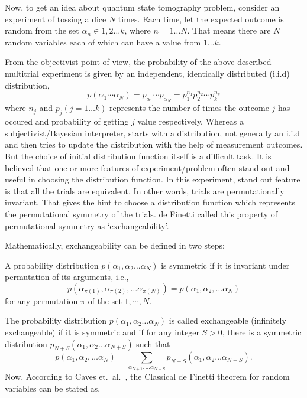 Now, to get an idea about quantum state tomography problem, consider an experiment of tossing a dice $N$ times. Each time, let the expected outcome is random from the set $\alpha_{n} \in 1, 2 \ldots k$, where $n = 1 \ldots N$. That means there are $N$ random variables each of which can have a value from $1 \ldots k$.

From the objectivist point of view, the probability of the above described multitrial experiment is given by an independent, identically distributed (i.i.d) distribution,
$$
p(\alpha_{1} \cdots \alpha_{N}) = p_{\alpha_{1}} \cdots p_{\alpha_{N}} = p_{1}^{n_{1}} p_{2}^{n_{2}} \cdots p_{k}^{n_{k}}
$$ 
where $n_{j}$ and $p_{j} (j= 1 \ldots k)$ represents the number of times the outcome $j$ has occured and probability of getting $j$ value respectively. Whereas a  subjectivist/Bayesian interpreter, starts with a distribution, not generally an i.i.d and then tries to update the distribution with the help of measurement outcomes. But the choice of initial distribution function itself is a difficult task. It is believed that one or more features of experiment/problem often stand out and useful in choosing the distribution function. In this experiment, stand out feature is that all the trials are equivalent. In other words, trials are permutationally invariant. That gives the hint to choose a distribution function which represents the permutational symmetry of the trials. de Finetti called this property of permutational symmetry as `exchangeability'.

Mathematically, exchangeability can be defined in two steps:

A probability distribution $p(\alpha_{1}, \alpha_{2} \ldots \alpha_{N} )$ is symmetric if it is invariant under permutation of its arguments, i.e., 
$$ 
p(\alpha_{\pi(1)}, \alpha_{\pi(2)}, \ldots \alpha_{\pi(N)}) = p (\alpha_{1}, \alpha_{2}, \ldots \alpha_{N})
$$ 
for any permutation $\pi$ of the set $1, \cdots ,N$.

The probability distribution $p(\alpha_{1}, \alpha_{2} \ldots \alpha_{N})$ is called exchangeable (infinitely exchangeable) if it is symmetric and if for any integer $S > 0$, there is a symmetric distribution $p_{N+S} (\alpha_{1}, \alpha_{2} \ldots \alpha_{N+S})$ such that
$$ 
p(\alpha_{1}, \alpha_{2}, \ldots \alpha_{N}) = \sum_{\alpha_{N+1},\ldots \alpha_{N+S}} p_{N+S} (\alpha_{1}, \alpha_{2} \ldots \alpha_{N+S}).
$$
Now, According to Caves et.\ al.\ \cite{chap27-key8}, the Classical de Finetti theorem for random variables can be stated as,

